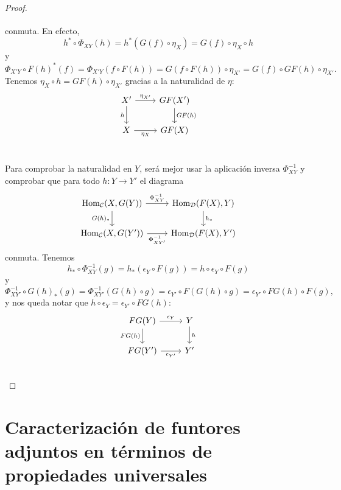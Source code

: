 \documentclass{article}
\numberwithin{equation}{section}
\theoremstyle{definition}
\begin{document}
\begin{proposicion}
\begin{proof}
\[\begin{tikzcd}
    \end{tikzcd} \]
  conmuta. En efecto,
  $$h^* \circ \Phi_{XY} (h) = h^* (G (f)\circ \eta_X) = G (f)\circ \eta_X\circ h$$
  y
  \[ \Phi_{X'Y}\circ F (h)^* (f) =
     \Phi_{X'Y} (f\circ F (h)) =
     G (f\circ F (h))\circ \eta_{X'} =
     G (f)\circ GF (h) \circ \eta_{X'}. \]
   Tenemos $\eta_X\circ h = GF (h) \circ \eta_{X'}$ gracias a la naturalidad de
   $\eta$:
   \[ \begin{tikzcd}
       X' \ar{r}{\eta_{X'}}\ar{d}[swap]{h} & GF (X')\ar{d}{GF (h)} \\
       X \ar{r}[swap]{\eta_X} & GF (X) \\
     \end{tikzcd} \]

   Para comprobar la naturalidad en $Y$, será mejor usar la aplicación inversa
   $\Phi_{XY}^{-1}$ y comprobar que para todo $h\colon Y\to Y'$ el diagrama
   \[ \begin{tikzcd}
       \Hom_\vcateg{C} (X, G (Y))\ar{d}[swap]{G (h)_*}\ar{r}{\Phi_{XY}^{-1}} & \Hom_\vcateg{D} (F (X), Y)\ar{d}{h_*}  \\
       \Hom_\vcateg{C} (X, G (Y'))\ar{r}[swap]{\Phi_{XY'}^{-1}} & \Hom_\vcateg{D} (F (X), Y')
     \end{tikzcd} \]
   conmuta. Tenemos
   $$h_*\circ \Phi_{XY}^{-1} (g) = h_* (\epsilon_Y\circ F (g)) = h\circ \epsilon_Y\circ F (g)$$
   y
   \[ \Phi_{XY'}^{-1}\circ G (h)_* (g) =
      \Phi_{XY'}^{-1} (G (h) \circ g) =
      \epsilon_{Y'}\circ F (G (h) \circ g) =
      \epsilon_{Y'}\circ FG (h) \circ F (g), \]
   y nos queda notar que $h\circ \epsilon_Y = \epsilon_{Y'}\circ FG (h)$:
   \[ \begin{tikzcd}
       FG (Y)\ar{r}{\epsilon_Y}\ar{d}[swap]{FG (h)} & Y\ar{d}{h} \\
       FG (Y')\ar{r}[swap]{\epsilon_{Y'}} & Y' \\
     \end{tikzcd} \]
 \end{proof}
\end{proposicion}


\section{Caracterización de funtores adjuntos en términos de propiedades universales}
\end{document}
